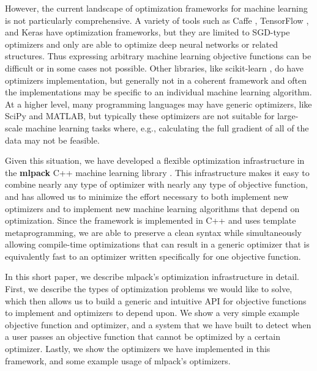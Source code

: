 \documentclass{article}
\begin{document}
However, the current landscape of optimization frameworks for machine learning
is not particularly comprehensive.  A variety of tools such as
Caffe \cite{jia2014caffe},
TensorFlow \cite{abadi2016tensorflow},
and
Keras \cite{chollet2015}
have optimization frameworks, but they are limited to SGD-type optimizers and
only are able to optimize deep neural networks or related structures.  Thus
expressing arbitrary machine learning objective functions can be difficult or in
some cases not possible.  Other libraries, like
scikit-learn \cite{pedregosa2011scikit},
do have optimizers implementation, but generally not in a coherent framework and
often the implementations may be specific to an individual machine learning
algorithm.  At a higher level, many programming languages may have generic
optimizers, like SciPy \cite{jones2014scipy} and MATLAB, but typically these
optimizers are not suitable for large-scale machine learning tasks where, e.g.,
calculating the full gradient of all of the data may not be feasible.

Given this situation, we have developed a flexible optimization infrastructure
in the {\bf mlpack} C++ machine learning library \cite{mlpack2013}.  This
infrastructure makes it easy to combine nearly any type of optimizer with nearly
any type of objective function, and has allowed us to minimize the effort
necessary to both implement new optimizers and to implement new machine learning
algorithms that depend on optimization.  Since the framework is implemented in
C++ and uses template metaprogramming, we are able to preserve a clean syntax
while simultaneously allowing compile-time optimizations that can result in a
generic optimizer that is equivalently fast to an optimizer written specifically
for one objective function.

In this short paper, we describe mlpack's optimization infrastructure in detail.
First, we describe the types of optimization problems we would like to solve,
which then allows us to build a generic and intuitive API for objective
functions to implement and optimizers to depend upon.  We show a very simple
example objective function and optimizer, and a system that we have built to
detect when a user passes an objective function that cannot be optimized by a
certain optimizer.  Lastly, we show the optimizers we have implemented in this
framework, and some example usage of mlpack's optimizers.

\end{document}
